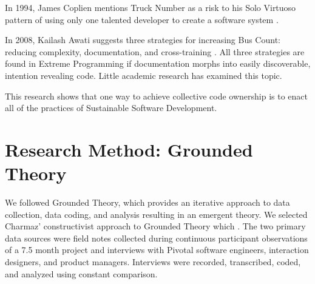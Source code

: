 In 1994, James Coplien mentions Truck Number as a risk to his Solo Virtuoso pattern of using only one talented developer to create a software system \cite{Coplien1994}. 

In 2008, Kailash Awati suggests three strategies for increasing Bus Count: reducing complexity, documentation, and cross-training \cite{AwatiBusFactor}. All three strategies are found in Extreme Programming if documentation morphs into easily discoverable, intention revealing code. Little academic research has examined this topic. 




This research shows that one way to achieve collective code ownership is to enact all of the practices of Sustainable Software Development.

\section{Research Method: Grounded Theory}
\label{ResearchMethod}

We followed Grounded Theory, \cite{Charmaz} which provides an iterative approach to data collection, data coding, and analysis resulting in an emergent theory. We selected Charmaz' constructivist approach to Grounded Theory which  \cite{StolGTinSE}. The two primary data sources were field notes collected during continuous participant observations of a 7.5 month project and interviews with Pivotal software engineers, interaction designers, and product managers. Interviews were recorded, transcribed, coded, and analyzed using constant comparison. 

